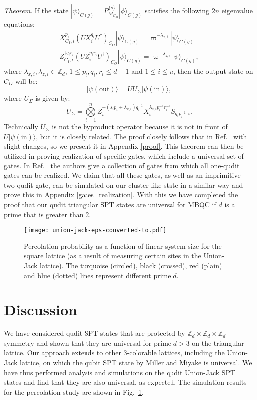 \documentclass[aps,amsfonts,pra,twocolumn,showpacs]{revtex4-1}
\newcommand{\be}{\begin{equation}}
\newcommand{\ee}{\end{equation}}
\newcommand{\zd}{\mathbb{Z}_d}
\begin{document}
	\textit{Theorem}. If the state $|\psi\rangle_{C(g)} = P^{\{s\}}_{M_{C_M}} |\phi\rangle_{C(g)}$ satisfies the following $2n$ eigenvalue equations:
		\begin{align}
		X^{p_i}_{C_I, i}(UX_i^{q_i}U^\dagger)_{C_O} |\psi\rangle_{C(g)} = \varpi^{-\lambda_{x, i}} |\psi\rangle_{C(g)}
		\label{thm1} \\
		Z^{\dagger q_ir_i}_{C_I, i}(UZ_i^{p_ir_i}U^\dagger)_{C_O} |\psi\rangle_{C(g)} = \varpi^{-\lambda_{z, i}} |\psi\rangle_{C(g)},
		\label{thm2}
		\end{align}
	where $\lambda_{x, i}, \lambda_{z, i} \in \zd$, $1 \leq p_i, q_i, r_i \leq d-1$ and $1 \leq i \leq n$, then the output state on $C_O$ will be:
		\be
		|\psi(\mathrm{out})\rangle = U U_\Sigma |\psi(\mathrm{in})\rangle,
		\ee
	where $U_\Sigma$ is given by:
		\be
		U_\Sigma = \overset{n}{\underset{i=1}{\bigotimes}} Z_i^{-(s_ip_i+\lambda_{x, i})q_i^{-1}}X_i^{\lambda_{z, i}p_i^{-1}r_i^{-1}}S_{q_ip_i^{-1}, i}.
		\label{byproduct}
		\ee
	Technically $U_\Sigma$ is not the byproduct operator because it is not in front of $U|\psi(\mathrm{in})\rangle$, but it is closely related. The proof closely follows that in Ref.~\cite{Raussendorf2003, Zhou2003} with slight changes, so we present it in Appendix \ref{proof}. This theorem can then be utilized in proving realization of specific gates, which include a universal set of gates. In Ref.~\cite{Zhou2003} the authors give a collection of gates from which all one-qudit gates can be realized. We claim that all these gates, as well as an imprimitive two-qudit gate, can be simulated on our cluster-like state in a similar way and prove this in Appendix \ref{gates_realization}. With this we have completed the proof that our qudit triangular SPT states are universal for MBQC if $d$ is a prime that is greater than 2.
	
	
	\begin{figure}[t!]
		\centering
		\texttt{[image: union-jack-eps-converted-to.pdf]}
		\caption{Percolation probability as a function of linear system size for the square lattice (as a result of measuring certain sites in the Union-Jack lattice). The turquoise (circled), black (crossed), red (plain) and blue (dotted) lines represent different prime $d$.}
		\label{numericalUJ}
	\end{figure}
	
 \section{Discussion} \label{sec:discussion}
We have considered qudit SPT states that are protected by $\zd\times \zd \times \zd$ symmetry and shown that they are universal for prime $d>3$ on the triangular lattice. Our approach extends to other 3-colorable lattices, including the Union-Jack lattice, on which the qubit SPT state by Miller and Miyake is universal. We have thus performed analysis and simulations on the qudit Union-Jack SPT states and find that they are also universal, as expected. The simulation results for the percolation study are shown in Fig.~\ref{numericalUJ}. 
\end{document}
